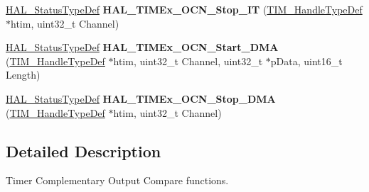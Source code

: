 \begin{DoxyCompactItemize}
\mbox{\hyperlink{stm32f7xx__hal__def_8h_a63c0679d1cb8b8c684fbb0632743478f}{H\+A\+L\+\_\+\+Status\+Type\+Def}} {\bfseries H\+A\+L\+\_\+\+T\+I\+M\+Ex\+\_\+\+O\+C\+N\+\_\+\+Stop\+\_\+\+IT} (\mbox{\hyperlink{struct_t_i_m___handle_type_def}{T\+I\+M\+\_\+\+Handle\+Type\+Def}} $\ast$htim, uint32\+\_\+t Channel)
\item 
\mbox{\label{group___t_i_m_ex___exported___functions___group2_gacf9eba45624d72a463fd0f950cf72964}} 
\mbox{\hyperlink{stm32f7xx__hal__def_8h_a63c0679d1cb8b8c684fbb0632743478f}{H\+A\+L\+\_\+\+Status\+Type\+Def}} {\bfseries H\+A\+L\+\_\+\+T\+I\+M\+Ex\+\_\+\+O\+C\+N\+\_\+\+Start\+\_\+\+D\+MA} (\mbox{\hyperlink{struct_t_i_m___handle_type_def}{T\+I\+M\+\_\+\+Handle\+Type\+Def}} $\ast$htim, uint32\+\_\+t Channel, uint32\+\_\+t $\ast$p\+Data, uint16\+\_\+t Length)
\item 
\mbox{\label{group___t_i_m_ex___exported___functions___group2_ga09216649456d28828492740232b275fd}} 
\mbox{\hyperlink{stm32f7xx__hal__def_8h_a63c0679d1cb8b8c684fbb0632743478f}{H\+A\+L\+\_\+\+Status\+Type\+Def}} {\bfseries H\+A\+L\+\_\+\+T\+I\+M\+Ex\+\_\+\+O\+C\+N\+\_\+\+Stop\+\_\+\+D\+MA} (\mbox{\hyperlink{struct_t_i_m___handle_type_def}{T\+I\+M\+\_\+\+Handle\+Type\+Def}} $\ast$htim, uint32\+\_\+t Channel)
\end{DoxyCompactItemize}


\subsection{Detailed Description}
Timer Complementary Output Compare functions. 

